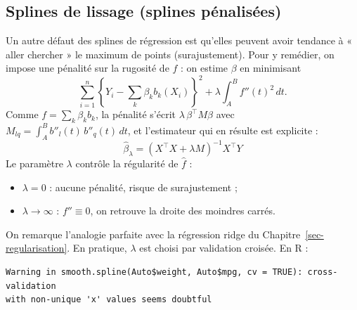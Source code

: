 \documentclass[
  french,
  letterpaper,
  DIV=11,
  numbers=noendperiod]{scrreprt}
\newenvironment{Shaded}{\begin{snugshade}}{\end{snugshade}}
\newcommand{\AttributeTok}[1]{\textcolor[rgb]{0.40,0.45,0.13}{#1}}
\newcommand{\ConstantTok}[1]{\textcolor[rgb]{0.56,0.35,0.01}{#1}}
\newcommand{\FunctionTok}[1]{\textcolor[rgb]{0.28,0.35,0.67}{#1}}
\newcommand{\NormalTok}[1]{\textcolor[rgb]{0.00,0.23,0.31}{#1}}
\newcommand{\OtherTok}[1]{\textcolor[rgb]{0.00,0.23,0.31}{#1}}
\newcommand{\SpecialCharTok}[1]{\textcolor[rgb]{0.37,0.37,0.37}{#1}}
\begin{document}
\subsection{Splines de lissage (splines
pénalisées)}\label{splines-de-lissage-splines-puxe9nalisuxe9es}

Un autre défaut des splines de régression est qu'elles peuvent avoir
tendance à « aller chercher » le maximum de points (surajustement). Pour
y remédier, on impose une pénalité sur la rugosité de \(f\) : on estime
\(\beta\) en minimisant
\[\sum_{i=1}^n\left\{Y_i - \sum_{k}\beta_k b_k(X_i)\right\}^2 + \lambda\int_A^B f''(t)^2\,dt.\]
Comme \(f = \sum_k \beta_k b_k\), la pénalité s'écrit
\(\lambda\,\beta^\top M\beta\) avec
\(M_{lq} = \int_A^B b''_l(t)\,b''_q(t)\,dt\), et l'estimateur qui en
résulte est explicite :
\[\boxed{\hat\beta_\lambda = (X^\top X + \lambda M)^{-1}X^\top Y}\] Le
paramètre \(\lambda\) contrôle la régularité de \(\hat f\) :

\begin{itemize}
\item
  \(\lambda = 0\) : aucune pénalité, risque de surajustement ;
\item
  \(\lambda\to\infty\) : \(f''\equiv 0\), on retrouve la droite des
  moindres carrés.
\end{itemize}

On remarque l'analogie parfaite avec la régression ridge du
Chapitre~\ref{sec-regularisation}. En pratique, \(\lambda\) est choisi
par validation croisée. En R :

\begin{Shaded}
\end{Shaded}

\begin{verbatim}
Warning in smooth.spline(Auto$weight, Auto$mpg, cv = TRUE): cross-validation
with non-unique 'x' values seems doubtful
\end{verbatim}

\begin{Shaded}
\end{Shaded}
\end{document}
